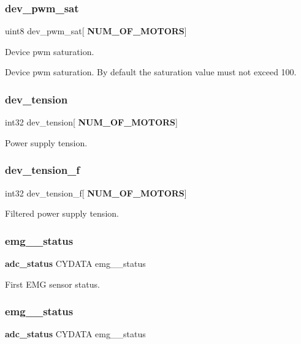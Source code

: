 \subsubsection{dev\+\_\+pwm\+\_\+sat}
{\footnotesize\ttfamily uint8 dev\+\_\+pwm\+\_\+sat[\textbf{ N\+U\+M\+\_\+\+O\+F\+\_\+\+M\+O\+T\+O\+RS}]}

Device pwm saturation.

Device pwm saturation. By default the saturation value must not exceed 100. \mbox{\label{globals_8h_aada869b6650bdd87ca481109ae08231c}} 
\subsubsection{dev\+\_\+tension}
{\footnotesize\ttfamily int32 dev\+\_\+tension[\textbf{ N\+U\+M\+\_\+\+O\+F\+\_\+\+M\+O\+T\+O\+RS}]}

Power supply tension. \mbox{\label{globals_8h_aa2494c7cd8f096ca7f2ead0a1430a597}} 
\subsubsection{dev\+\_\+tension\+\_\+f}
{\footnotesize\ttfamily int32 dev\+\_\+tension\+\_\+f[\textbf{ N\+U\+M\+\_\+\+O\+F\+\_\+\+M\+O\+T\+O\+RS}]}

Filtered power supply tension. \mbox{\label{globals_8h_af909e8281823c106dd4191858f995b32}} 
\subsubsection{emg\+\_\+\_\+status}
{\footnotesize\ttfamily \textbf{ adc\+\_\+status} C\+Y\+D\+A\+TA emg\+\_\+\_\+status}

First E\+MG sensor status. \mbox{\label{globals_8h_ab157f05be16bbec6bbbf4966ee61f5cd}} 
\subsubsection{emg\+\_\+\_\+status}
{\footnotesize\ttfamily \textbf{ adc\+\_\+status} C\+Y\+D\+A\+TA emg\+\_\+\_\+status}

